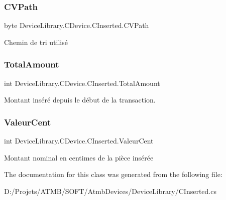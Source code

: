 \subsubsection{\texorpdfstring{C\+V\+Path}{CVPath}}
{\footnotesize\ttfamily byte Device\+Library.\+C\+Device.\+C\+Inserted.\+C\+V\+Path}



Chemin de tri utilisé 

\mbox{\label{class_device_library_1_1_c_device_1_1_c_inserted_af8489940b66b948f63c38c86051416be}} 
\subsubsection{\texorpdfstring{Total\+Amount}{TotalAmount}}
{\footnotesize\ttfamily int Device\+Library.\+C\+Device.\+C\+Inserted.\+Total\+Amount}



Montant inséré depuis le début de la transaction. 

\mbox{\label{class_device_library_1_1_c_device_1_1_c_inserted_ab9c8961b8a31a68caeb666da2763b167}} 
\subsubsection{\texorpdfstring{Valeur\+Cent}{ValeurCent}}
{\footnotesize\ttfamily int Device\+Library.\+C\+Device.\+C\+Inserted.\+Valeur\+Cent}



Montant nominal en centimes de la pièce insérée 



The documentation for this class was generated from the following file\+:\begin{DoxyCompactItemize}
\item 
D\+:/\+Projets/\+A\+T\+M\+B/\+S\+O\+F\+T/\+Atmb\+Devices/\+Device\+Library/C\+Inserted.\+cs\end{DoxyCompactItemize}
